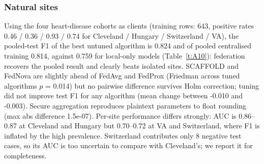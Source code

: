 \documentclass[conference]{IEEEtran}
\begin{document}
\subsubsection{Natural sites}
Using the four heart-disease cohorts as clients (training rows: 643, positive rates 0.46 / 0.36 / 0.93 / 0.74 for Cleveland / Hungary / Switzerland / VA), the pooled-test F1 of the best untuned algorithm is 0.824 and of pooled centralised training 0.814, against 0.759 for local-only models (Table~\ref{t:A10}): federation recovers the pooled result and clearly beats isolated sites. SCAFFOLD and FedNova are slightly ahead of FedAvg and FedProx (Friedman across tuned algorithms $p$ = 0.014) but no pairwise difference survives Holm correction; tuning did not improve test F1 for any algorithm (mean change between -0.010 and -0.003). Secure aggregation reproduces plaintext parameters to float rounding (max abs difference 1.5e-07). Per-site performance differs strongly: AUC is 0.86--0.87 at Cleveland and Hungary but 0.70--0.72 at VA and Switzerland, where F1 is inflated by the high prevalence. Switzerland contributes only 8 negative test cases, so its AUC is too uncertain to compare with Cleveland's; we report it for completeness.
\begin{table}[t]\centering\caption{Natural sites, protocol A (within-site holdout), pooled test, 10 splits.}\label{t:A10}\scriptsize
{}\end{table}
\end{document}
